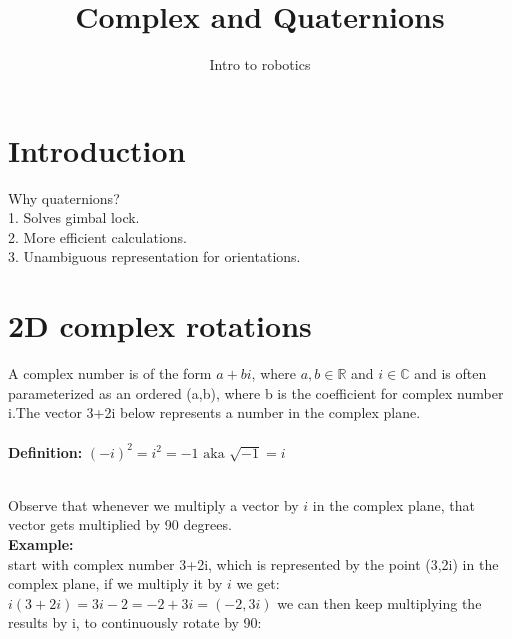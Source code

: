 \documentclass{article}
\title{Complex and Quaternions}
\author{Intro to robotics}
\date{}
\begin{document}
\maketitle

\section{Introduction}
Why quaternions?\\
1. Solves gimbal lock.\\
2. More efficient calculations.\\
3. Unambiguous representation for orientations.

\section{2D complex rotations}
A complex number is of the form $a+bi$, where $a,b \in \mathbb{R}$  and $i \in \mathbb{C}$ and is often parameterized as an ordered (a,b), where b is the coefficient for complex number i.The vector 3+2i below represents a number in the complex plane. \\\\
\textbf{Definition: } $(-i)^2=i^2=-1 \text{ aka } \sqrt{-1}=i$\\\\
\newpage
Observe that whenever we multiply a vector by $i$ in the complex plane, that vector gets multiplied by 90 degrees. \\
\textbf{Example: }\\
start with complex number 3+2i, which is represented by the point (3,2i) in the complex plane, if we multiply it by $i$ we get:\\
$i(3+2i)=3i-2=-2+3i=(-2,3i)$ we can then keep multiplying the results by i, to continuously rotate by 90:\\
\end{document}

